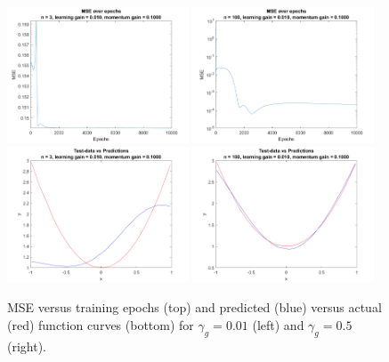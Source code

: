 \documentclass[11pt,pdftex,portrait,letterpaper]{article}
\begin{document}
\begin{figure}[h]
    \centering
    \includegraphics[width=0.48\textwidth]{./figures/mse_3_0.010_0.1000}
    \includegraphics[width=0.48\textwidth]{./figures/mse_100_0.010_0.1000}\\
    \includegraphics[width=0.48\textwidth]{./figures/function_fitting_3_0.010_0.1000}
    \includegraphics[width=0.48\textwidth]{./figures/function_fitting_100_0.010_0.1000}
    \caption{MSE versus training epochs (top) and predicted (blue) versus actual (red) function curves (bottom) for $\gamma_g=0.01$ (left) and $\gamma_g=0.5$ (right).}
    \label{f:hiddenCompare}
\end{figure}
\end{document}
